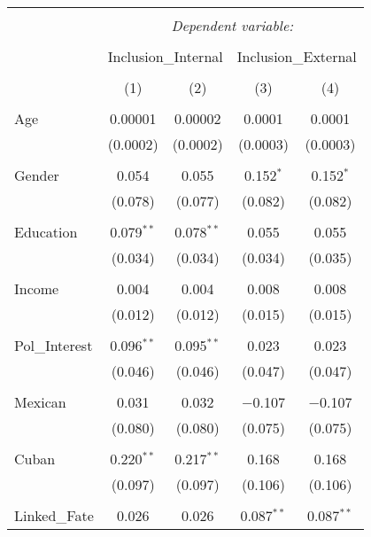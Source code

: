 
\begin{table}[!htbp] \centering 
  \caption{} 
  \label{} 
\begin{tabular}{@{\extracolsep{5pt}}lcccc} 
\\[-1.8ex]\hline 
\hline \\[-1.8ex] 
 & \multicolumn{4}{c}{\textit{Dependent variable:}} \\ 
\cline{2-5} 
\\[-1.8ex] & \multicolumn{2}{c}{Inclusion\_Internal} & \multicolumn{2}{c}{Inclusion\_External} \\ 
\\[-1.8ex] & (1) & (2) & (3) & (4)\\ 
\hline \\[-1.8ex] 
 Age & 0.00001 & 0.00002 & 0.0001 & 0.0001 \\ 
  & (0.0002) & (0.0002) & (0.0003) & (0.0003) \\ 
  & & & & \\ 
 Gender & 0.054 & 0.055 & 0.152$^{*}$ & 0.152$^{*}$ \\ 
  & (0.078) & (0.077) & (0.082) & (0.082) \\ 
  & & & & \\ 
 Education & 0.079$^{**}$ & 0.078$^{**}$ & 0.055 & 0.055 \\ 
  & (0.034) & (0.034) & (0.034) & (0.035) \\ 
  & & & & \\ 
 Income & 0.004 & 0.004 & 0.008 & 0.008 \\ 
  & (0.012) & (0.012) & (0.015) & (0.015) \\ 
  & & & & \\ 
 Pol\_Interest & 0.096$^{**}$ & 0.095$^{**}$ & 0.023 & 0.023 \\ 
  & (0.046) & (0.046) & (0.047) & (0.047) \\ 
  & & & & \\ 
 Mexican & 0.031 & 0.032 & $-$0.107 & $-$0.107 \\ 
  & (0.080) & (0.080) & (0.075) & (0.075) \\ 
  & & & & \\ 
 Cuban & 0.220$^{**}$ & 0.217$^{**}$ & 0.168 & 0.168 \\ 
  & (0.097) & (0.097) & (0.106) & (0.106) \\ 
  & & & & \\ 
 Linked\_Fate & 0.026 & 0.026 & 0.087$^{**}$ & 0.087$^{**}$ \\ 

\end{tabular}
\end{table}
